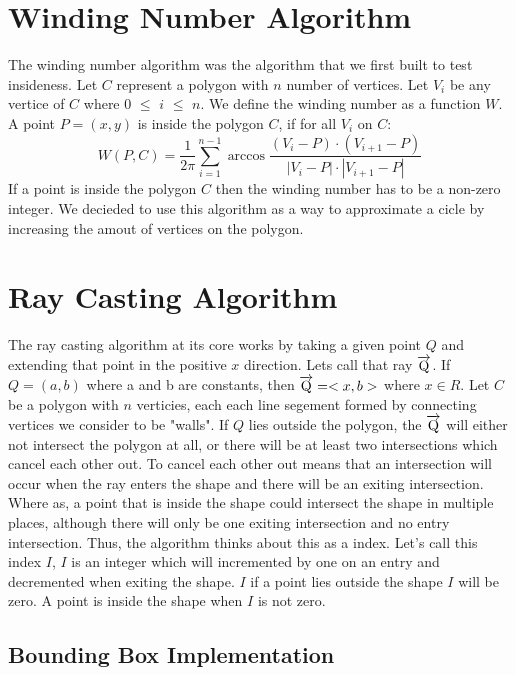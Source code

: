\documentclass{article}
\begin{document}
\section{Winding Number Algorithm}
The winding number algorithm was the algorithm that we first built to test insideness.
Let $C$ represent a polygon with $n$ number of vertices.
Let $V_i$ be any vertice of $C$ where $0$ $\leq$ $i$ $\leq$ $n$.
We define the winding number as a function $W$.
A point $P = (x,y)$ is inside the polygon $C$, if for all $V_i$ on $C$:
$$
W(P,C) = \frac{1}{2\pi}\sum_{i=1}^{n-1}\arccos{\frac{(V_i-P)\cdot (V_{i+1}-P)}{|V_i-P|\cdot |V_{i+1}-P|}}
$$
If a point is inside the polygon $C$ then the winding number has to be a non-zero integer.
We decieded to use this algorithm as a way to approximate a cicle by increasing the amout of vertices on the polygon.

\section{Ray Casting Algorithm}

The ray casting algorithm at its core works by taking a given point $Q$ and extending that point in the positive $x$ direction.
Lets call that ray $\overrightarrow{\rm Q}$.
If $Q = (a,b)$ where a and b are constants, then $\overrightarrow{\rm Q} = <x, b>$ where $x \in R$.
Let $C$ be a polygon with $n$ verticies, each each line segement formed by connecting vertices we consider to be "walls".
If $Q$ lies outside the polygon, the $\overrightarrow{\rm Q}$ will either not intersect the polygon at all, or there will be at least two intersections which cancel each other out.
To cancel each other out means that an intersection will occur when the ray enters the shape and there will be an exiting intersection.
Where as, a point that is inside the shape could intersect the shape in multiple places, although there will only be one exiting intersection and no entry intersection.
Thus, the algorithm thinks about this as a index.
Let's call this index $I$, $I$ is an integer which will incremented by one on an entry and decremented when exiting the shape.
$I$ if a point lies outside the shape $I$ will be zero.
A point is inside the shape when $I$ is not zero.

\subsection{Bounding Box Implementation}
\end{document}
